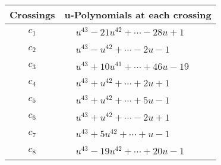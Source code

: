 \documentclass[1p]{elsarticle_modified}
\theoremstyle{definition}
\begin{document}
\begin{tabular}{m{50pt}|m{274pt}}
Crossings & \hspace{64pt}u-Polynomials at each crossing \\
\hline $$\begin{aligned}c_{1}\end{aligned}$$&$\begin{aligned}
&u^{43}-21 u^{42}+\cdots-28 u+1
\end{aligned}$\\
\hline $$\begin{aligned}c_{2}\end{aligned}$$&$\begin{aligned}
&u^{43}- u^{42}+\cdots-2 u-1
\end{aligned}$\\
\hline $$\begin{aligned}c_{3}\end{aligned}$$&$\begin{aligned}
&u^{43}+10 u^{41}+\cdots+46 u-19
\end{aligned}$\\
\hline $$\begin{aligned}c_{4}\end{aligned}$$&$\begin{aligned}
&u^{43}+u^{42}+\cdots+2 u+1
\end{aligned}$\\
\hline $$\begin{aligned}c_{5}\end{aligned}$$&$\begin{aligned}
&u^{43}+u^{42}+\cdots+5 u-1
\end{aligned}$\\
\hline $$\begin{aligned}c_{6}\end{aligned}$$&$\begin{aligned}
&u^{43}+u^{42}+\cdots-2 u+1
\end{aligned}$\\
\hline $$\begin{aligned}c_{7}\end{aligned}$$&$\begin{aligned}
&u^{43}+5 u^{42}+\cdots+u-1
\end{aligned}$\\
\hline $$\begin{aligned}c_{8}\end{aligned}$$&$\begin{aligned}
&u^{43}-19 u^{42}+\cdots+20 u-1
\end{aligned}$\\

\end{tabular}
\end{document}
